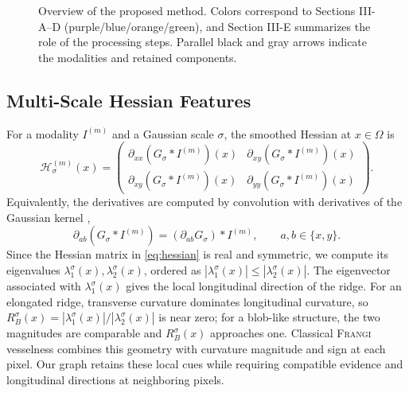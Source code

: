 \documentclass[conference,a4paper]{IEEEtran}
\newcommand{\Frangi}{\textnormal{\textsc{Frangi}}}
\newcommand{\Hess}{\mathcal{H}}
\begin{document}
\begin{figure}[!t]
    \caption{Overview of the proposed method. Colors correspond to Sections III-A--D (purple/blue/orange/green), and Section III-E summarizes the role of the processing steps. Parallel black and gray arrows indicate the modalities and retained components.}
    \label{fig:method_overview}
\end{figure}

\subsection{Multi-Scale Hessian Features}
For a modality $I^{(m)}$ and a Gaussian scale $\sigma$, the smoothed Hessian at $x\in\Omega$ is
\begin{equation}
\Hess_{\sigma}^{(m)}(x)=
\begin{pmatrix}
\partial_{xx}(G_\sigma*I^{(m)})(x) & \partial_{xy}(G_\sigma*I^{(m)})(x) \\
\partial_{xy}(G_\sigma*I^{(m)})(x) & \partial_{yy}(G_\sigma*I^{(m)})(x)
\end{pmatrix}.
\label{eq:hessian}
\end{equation}
Equivalently, the derivatives are computed by convolution with derivatives of the Gaussian kernel \cite{Lindeberg1998, Frangi1998}, 
\begin{equation}
\partial_{ab}(G_\sigma*I^{(m)})=(\partial_{ab}G_\sigma)*I^{(m)},\qquad a,b\in\{x,y\}.
\end{equation}
Since the Hessian matrix in \eqref{eq:hessian} is real and symmetric, we compute its eigenvalues $\lambda_1^\sigma(x),\lambda_2^\sigma(x)$, ordered as $|\lambda_1^\sigma(x)|\le |\lambda_2^\sigma(x)|$. The eigenvector associated with $\lambda_1^\sigma(x)$ gives the local longitudinal direction of the ridge.
For an elongated ridge, transverse curvature dominates longitudinal curvature, so $R_B^\sigma(x)=|\lambda_1^\sigma(x)|/|\lambda_2^\sigma(x)|$ is near zero; for a blob-like structure, the two magnitudes are comparable and $R_B^\sigma(x)$ approaches one. Classical \Frangi{} vesselness combines this geometry with curvature magnitude and sign at each pixel. Our graph retains these local cues while requiring compatible evidence and longitudinal directions at neighboring pixels.
\end{document}
